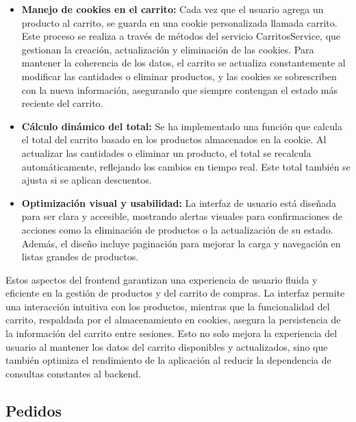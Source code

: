 \begin{itemize}
\begin{itemize}
    \item \textbf{Manejo de cookies en el carrito: } Cada vez que el usuario agrega un producto al carrito, se guarda en una cookie personalizada llamada carrito. Este proceso se realiza a través de métodos del servicio CarritosService, que gestionan la creación, actualización y eliminación de las cookies. Para mantener la coherencia de los datos, el carrito se actualiza constantemente al modificar las cantidades o eliminar productos, y las cookies se sobrescriben con la nueva información, asegurando que siempre contengan el estado más reciente del carrito.
    
    \item \textbf{Cálculo dinámico del total: } Se ha implementado una función que calcula el total del carrito basado en los productos almacenados en la cookie. Al actualizar las cantidades o eliminar un producto, el total se recalcula automáticamente, reflejando los cambios en tiempo real. Este total también se ajusta si se aplican descuentos.
    
    \item \textbf{Optimización visual y usabilidad: } La interfaz de usuario está diseñada para ser clara y accesible, mostrando alertas visuales para confirmaciones de acciones como la eliminación de productos o la actualización de su estado. Además, el diseño incluye paginación para mejorar la carga y navegación en listas grandes de productos.

    
    
    \end{itemize}
    
    Estos aspectos del frontend garantizan una experiencia de usuario fluida y eficiente en la gestión de productos y del carrito de compras. La interfaz permite una interacción intuitiva con los productos, mientras que la funcionalidad del carrito, respaldada por el almacenamiento en cookies, asegura la persistencia de la información del carrito entre sesiones. Esto no solo mejora la experiencia del usuario al mantener los datos del carrito disponibles y actualizados, sino que también optimiza el rendimiento de la aplicación al reducir la dependencia de consultas constantes al backend.



    \vspace{0.5cm}
\end{itemize}
 
\subsection{Pedidos}\label{subsec5.4.3}

